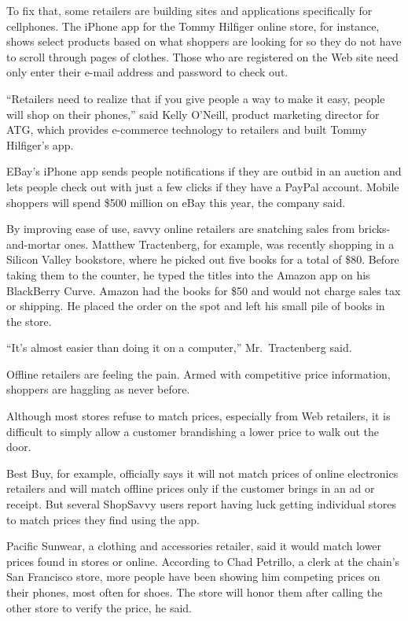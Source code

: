 ﻿\documentclass[12pt]{article}
\begin{document}
To fix that, some retailers are building sites and applications specifically for cellphones. The
iPhone app for the Tommy Hilfiger online store, for instance, shows select products based on what
shoppers are looking for so they do not have to scroll through pages of clothes. Those who are
registered on the Web site need only enter their e-mail address and password to check out.

``Retailers need to realize that if you give people a way to make it easy, people will shop on their
phones,'' said Kelly O'Neill, product marketing director for ATG, which provides e-commerce
technology to retailers and built Tommy Hilfiger's app.

EBay's iPhone app sends people notifications if they are outbid in an auction and lets people check
out with just a few clicks if they have a PayPal account. Mobile shoppers will spend \$500 million
on eBay this year, the company said.

By improving ease of use, savvy online retailers are snatching sales from bricks-and-mortar ones.
Matthew Tractenberg, for example, was recently shopping in a Silicon Valley bookstore, where he
picked out five books for a total of \$80. Before taking them to the counter, he typed the titles
into the Amazon app on his BlackBerry Curve. Amazon had the books for \$50 and would not charge
sales tax or shipping. He placed the order on the spot and left his small pile of books in the
store.

``It's almost easier than doing it on a computer,'' Mr.~Tractenberg said.

Offline retailers are feeling the pain. Armed with competitive price information, shoppers are
haggling as never before.

Although most stores refuse to match prices, especially from Web retailers, it is difficult to
simply allow a customer brandishing a lower price to walk out the door.

Best Buy, for example, officially says it will not match prices of online electronics retailers and
will match offline prices only if the customer brings in an ad or receipt. But several ShopSavvy
users report having luck getting individual stores to match prices they find using the app.

Pacific Sunwear, a clothing and accessories retailer, said it would match lower prices found in
stores or online. According to Chad Petrillo, a clerk at the chain's San Francisco store, more
people have been showing him competing prices on their phones, most often for shoes. The store will
honor them after calling the other store to verify the price, he said.
\end{document}
